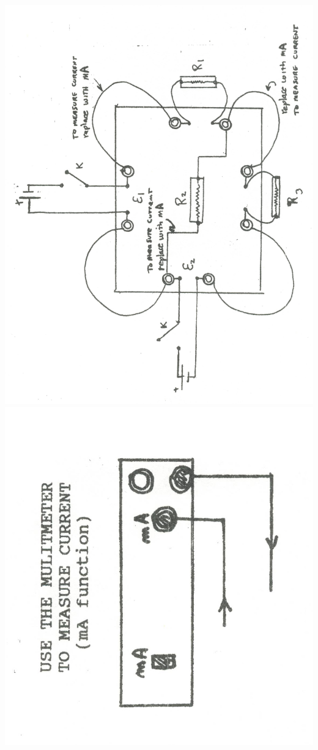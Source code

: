 \begin{center}
   {\includegraphics[scale=0.9]{5bgraf/fig_10b}\label{f:fig10b}}
   {\includegraphics[scale=0.4]{5bgraf/fig_10a}\label{f:fig10a}}
	\label{f:circboard}
\end{center}


